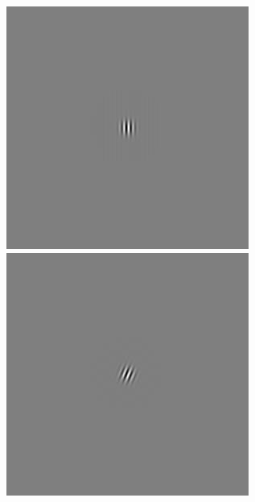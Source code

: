 \begin{figure}[ht]
 \begin{center}
 \includegraphics[width=\columnwidth/9]{ch4/figures/iGabor0_0.jpg}
 \includegraphics[width=\columnwidth/9]{ch4/figures/iGabor0_1.jpg}

\end{center}
\end{figure}
